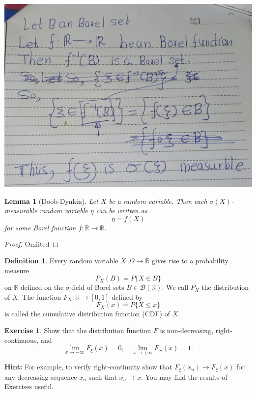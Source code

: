 \documentclass[
]{book}
\newtheorem{lemma}{Lemma}[chapter]
\theoremstyle{definition}
\newtheorem{definition}{Definition}[chapter]
\theoremstyle{definition}
\theoremstyle{definition}
\newtheorem{exercise}{Exercise}[chapter]
\theoremstyle{definition}
\theoremstyle{remark}
\begin{document}
\includegraphics[width=18cm,height=\textheight]{fig/fig5.jpg}

\begin{lemma}[Doob-Dynkin]
\protect\hypertarget{lem:unnamed-chunk-18}{}\label{lem:unnamed-chunk-18}Let \(X\) be a random variable. Then each \(\sigma(X)\)-measurable random variable \(\eta\) can
be written as
\[
\eta = f(X)
\]
for some Borel function \(f : \mathbb{R} \to \mathbb{R}\).
\end{lemma}

\begin{proof}
Omiited
\end{proof}

\begin{definition}
\protect\hypertarget{def:unnamed-chunk-20}{}\label{def:unnamed-chunk-20}Every random variable \(X : \Omega \to \mathbb{R}\) gives rise to a probability measure
\[ P_X(B) = P\{X \in B\} \]
on \(\mathbb{R}\) defined on the \(\sigma\)-field of Borel sets \(B \in \mathcal{B}(\mathbb{R})\). We call \(P_X\) the distribution
of \(X\). The function \(F_X : \mathbb{R} \to [0, 1]\) defined by
\[ F_X(x) = P\{X \leq x\} \]
is called the cumulative distribution function (CDF) of \(X\).
\end{definition}

\begin{exercise}
\protect\hypertarget{exr:unnamed-chunk-21}{}\label{exr:unnamed-chunk-21}Show that the distribution function \(F\) is non-decreasing, right-continuous, and
\[
\lim_{x \to -\infty} F_{\xi}(x) = 0, \quad \lim_{x \to +\infty} F_{\Xi}(x) = 1.
\]

\textbf{Hint:} For example, to verify right-continuity show that \(F_{\xi}(x_n) \to F_{\xi}(x)\) for any decreasing sequence \(x_n\) such that \(x_n \to x\). You may find the results of Exercises useful.
\end{exercise}
\end{document}
